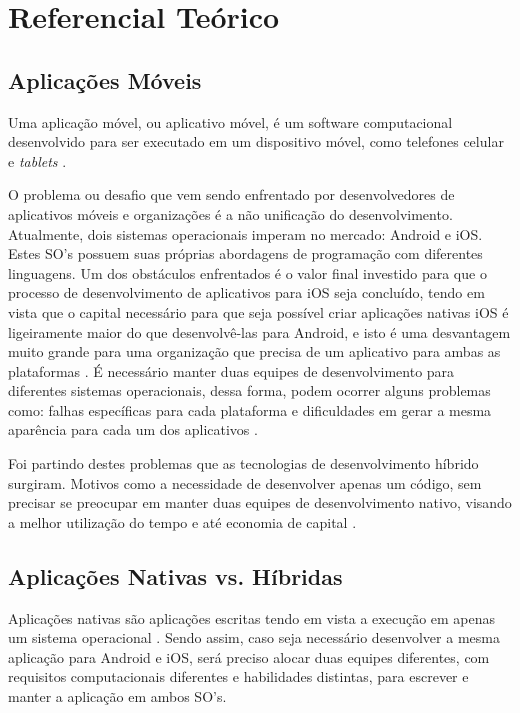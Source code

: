 

\chapter{Referencial Teórico}\label{referencial_teorico}

\section{Aplicações Móveis}
Uma aplicação móvel, ou aplicativo móvel, é um software computacional desenvolvido para ser executado em um dispositivo móvel, como telefones celular e \textit{tablets} \cite{clow2019flutter}. 

O problema ou desafio que vem sendo enfrentado por desenvolvedores de aplicativos móveis e organizações é a não unificação do desenvolvimento. Atualmente, dois sistemas operacionais imperam no mercado: Android e iOS. Estes SO's possuem suas próprias abordagens de programação com diferentes linguagens. Um dos obstáculos enfrentados é o valor final investido para que o processo de desenvolvimento de aplicativos para iOS seja concluído, tendo em vista que o capital necessário para que seja possível criar aplicações nativas iOS é ligeiramente maior do que desenvolvê-las para Android, e isto é uma desvantagem muito grande para uma organização que precisa de um aplicativo para ambas as plataformas \cite{goadrich2011smart}. É necessário manter duas equipes de desenvolvimento para diferentes sistemas operacionais, dessa forma, podem ocorrer alguns problemas como: falhas específicas para cada plataforma e dificuldades em gerar a mesma aparência para cada um dos aplicativos \cite{clow2019flutter}. 

Foi partindo destes problemas que as tecnologias de desenvolvimento híbrido surgiram. Motivos como a necessidade de desenvolver apenas um código, sem precisar se preocupar em manter duas equipes de desenvolvimento nativo, visando a melhor utilização do tempo e até economia de capital \cite{yatsenko2019comparative}{}. 

\section{Aplicações Nativas vs. Híbridas}
Aplicações nativas são aplicações escritas tendo em vista a execução em apenas um sistema operacional \cite{clow2019flutter}. Sendo assim, caso seja necessário desenvolver a mesma aplicação para Android e iOS, será preciso alocar duas equipes diferentes, com requisitos computacionais diferentes e habilidades distintas, para escrever e manter a aplicação em ambos SO's.


